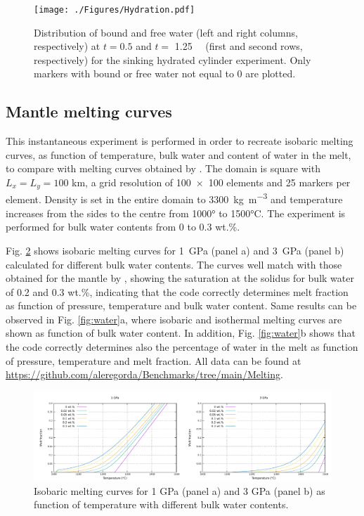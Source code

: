 \documentclass[hidelinks,10pt,a4paper]{article}
\begin{document}
\begin{figure}
\centering
\noindent\texttt{[image: ./Figures/Hydration.pdf]}
\caption{Distribution of bound and free water (left and right columns, respectively) at $t=0.5$ and $t=$ \SI{1.25}{\mega\year} (first and second rows,
respectively) for the sinking hydrated cylinder experiment. Only markers with bound or free water not equal to 0 are plotted.}
\label{fig:quinquis}
\end{figure}

\subsection{Mantle melting curves}\label{sec:katz}
This instantaneous experiment is performed in order to recreate isobaric melting curves, as function of temperature, bulk water and content of water in the
melt, to compare with melting curves obtained by \citet{Katz2003}. The domain is square with $L_x=L_y=100$ km, a grid resolution of \num{100x100} elements and
25 markers per element. Density is set in the entire domain to \SI{3300}{\kg\per\cubic\m} and temperature increases from the sides to the centre from 1000° to
1500°C. The experiment is performed for bulk water contents from 0 to 0.3 wt.\%.

Fig. \ref{fig:fraction} shows isobaric melting curves for \SI{1}{\giga\pascal} (panel a) and \SI{3}{\giga\pascal} (panel b) calculated for different bulk water
contents. The curves well match with those obtained for the mantle by \citet{Katz2003}, showing the saturation at the solidus for bulk water of 0.2 and 0.3 wt.\%, indicating
that the code correctly determines melt fraction as function of pressure, temperature and bulk water content. Same results can be observed in Fig.
\ref{fig:water}a, where isobaric and isothermal melting curves are shown as function of bulk water content. In addition, Fig. \ref{fig:water}b shows that the
code correctly determines also the percentage of water in the melt as function of pressure, temperature and melt fraction. 
All data can be found at \url{https://github.com/aleregorda/Benchmarks/tree/main/Melting}.

\begin{figure}
\noindent\includegraphics[width=\textwidth]{./Figures/Fraction.pdf}
\caption{Isobaric melting curves for 1 GPa (panel a) and 3 GPa (panel b) as function of temperature with different bulk water contents.}
\label{fig:fraction}
\end{figure}
\end{document}
